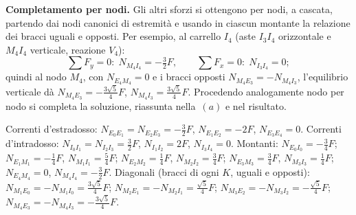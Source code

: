 \begin{esercizio}
\begin{svolgimento}



		
		\noindent\textbf{Completamento per nodi.}
		Gli altri sforzi si ottengono per nodi, a cascata,
		partendo dai nodi canonici di estremità e usando in
		ciascun montante la relazione dei bracci uguali e
		opposti. Per esempio, al carrello $I_4$ (aste
		$I_3I_4$ orizzontale e $M_4I_4$ verticale, reazione
		$V_4$):
		\[
		\sum F_y = 0:\; N_{M_4I_4} = -\tfrac32 F,
		\qquad
		\sum F_x = 0:\; N_{I_3I_4} = 0;
		\]
		quindi al nodo $M_4$, con $N_{E_4M_4}=0$ e i bracci
		opposti $N_{M_4E_3} = -N_{M_4I_3}$, l'equilibrio
		verticale dà
		$N_{M_4E_3} = -\tfrac{3\sqrt5}{4}F$,
		$N_{M_4I_3} = \tfrac{3\sqrt5}{4}F$. Procedendo
		analogamente nodo per nodo si completa la soluzione,
		riassunta nella \,$(a)$
		e nel risultato.
		
	\end{svolgimento}
	
	\risultato
	Correnti d'estradosso:
	$N_{E_0E_1}=N_{E_2E_3}=-\tfrac32 F$,\;
	$N_{E_1E_2}=-2F$,\;
	$N_{E_3E_4}=0$.
	Correnti d'intradosso:
	$N_{I_0I_1}=N_{I_2I_3}=\tfrac32 F$,\;
	$N_{I_1I_2}=2F$,\;
	$N_{I_3I_4}=0$.
	Montanti:
	$N_{E_0I_0}=-\tfrac34 F$;\;
	$N_{E_1M_1}=-\tfrac14 F$, $N_{M_1I_1}=\tfrac54 F$;\;
	$N_{E_2M_2}=\tfrac14 F$, $N_{M_2I_2}=\tfrac34 F$;\;
	$N_{E_3M_3}=\tfrac34 F$, $N_{M_3I_3}=\tfrac14 F$;\;
	$N_{E_4M_4}=0$, $N_{M_4I_4}=-\tfrac32 F$.
	Diagonali (bracci di ogni $K$, uguali e opposti):
	$N_{M_1E_0}=-N_{M_1I_0}=\tfrac{3\sqrt5}{4}F$;\;
	$N_{M_2E_1}=-N_{M_2I_1}=\tfrac{\sqrt5}{4}F$;\;
	$N_{M_3E_2}=-N_{M_3I_2}=-\tfrac{\sqrt5}{4}F$;\;
	$N_{M_4E_3}=-N_{M_4I_3}=-\tfrac{3\sqrt5}{4}F$.
	
\end{esercizio}


